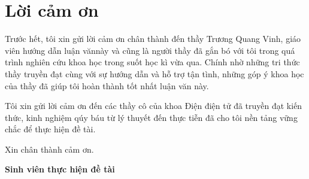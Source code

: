\chapter*{Lời cảm ơn}
Trước hết, tôi xin gửi lời cảm ơn chân thành đến thầy Trương Quang Vinh,
giáo viên hướng dẫn luận vănnày và cũng là người thầy đã gắn bó với tôi trong quá trình nghiên cứu khoa học trong suốt học kì vừa qua.
Chính nhờ những tri thức thầy truyền đạt cùng với sự hướng dẫn và hỗ trợ tận tình, những góp ý khoa học của thầy đã giúp tôi hoàn thành tốt nhất luận văn này.

Tôi xin gửi lời cảm ơn đến các thầy cô của khoa Điện điện tử đã truyền đạt kiến thức,
kinh nghiệm qúy báu từ lý thuyết đến thực tiễn đã cho tôi nền tảng vững chắc để thực hiện đề tài.

Xin chân thành cảm ơn.
\begin{flushright}
\textbf{Sinh viên thực hiện đề tài}
\end{flushright}
